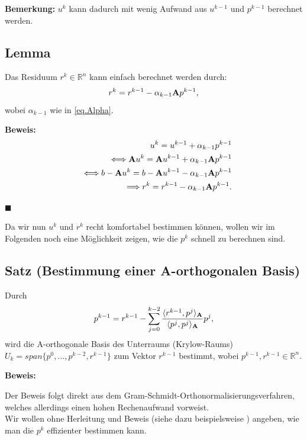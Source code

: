 \textbf{Bemerkung:}
$u^{k}$ kann dadurch mit wenig Aufwand aus $u^{k-1}$ und $p^{k-1}$ berechnet werden.

\subsection{Lemma}
Das Residuum $r^{k} \in \mathbb{R}^{n}$ kann einfach berechnet werden durch:
\begin{equation}
r^{k} = r^{k-1} - \alpha_{k-1}{\textbf{A}}p^{k-1},
\end{equation}
wobei $\alpha_{k-1}$ wie in \autoref{eq.Alpha}.

\textbf{Beweis:}
\begin{eqnarray}
&&u^{k} = u^{k-1} + \alpha_{k-1}p^{k-1} \notag \\
&&\Longleftrightarrow {\textbf{A}}u^{k} = {\textbf{A}}u^{k-1} + \alpha_{k-1}{\textbf{A}}p^{k-1} \notag \\
&&\Longleftrightarrow b - {\textbf{A}}u^{k} = b - {\textbf{A}}u^{k-1} - \alpha_{k-1}{\textbf{A}}p^{k-1} \notag \\
&&\Longrightarrow r^{k} = r^{k-1} - \alpha_{k-1}{\textbf{A}}p^{k-1}. \notag
\end{eqnarray}
\begin{flushright}
$\blacksquare$
\end{flushright}

Da wir nun $u^{k}$ und $r^{k}$ recht komfortabel bestimmen können, wollen wir im Folgenden noch eine Möglichkeit zeigen, wie die $p^{k}$ schnell zu berechnen sind.

\subsection{Satz (Bestimmung einer A-orthogonalen Basis)}
Durch
\begin{equation}
p^{k-1} = r^{k-1} - \sum_{j=0}^{k-2} \frac {\langle r^{k-1}, p^{j} \rangle _{{\textbf{A}}}} {\langle p^{j}, p^{j} \rangle _{{\textbf{A}}}} p^{j},
\end{equation}
wird die A-orthogonale Basis des Unterraums (Krylow-Raums) $U_{k} = span\{p^{0}, ..., p^{k-2},r^{k-1}\}$ zum Vektor $r^{k-1}$ bestimmt, wobei $p^{k-1},r^{k-1} \in \mathbb{R}^{n}$.

\textbf{Beweis:}

Der Beweis folgt direkt aus dem Gram-Schmidt-Orthonormalisierungsverfahren, welches allerdings einen hohen Rechenaufwand vorweist.\\
Wir wollen ohne Herleitung und Beweis (siehe dazu beispielsweise \cite{DR9}) angeben, wie man die $p^{k}$ effizienter bestimmen kann.

